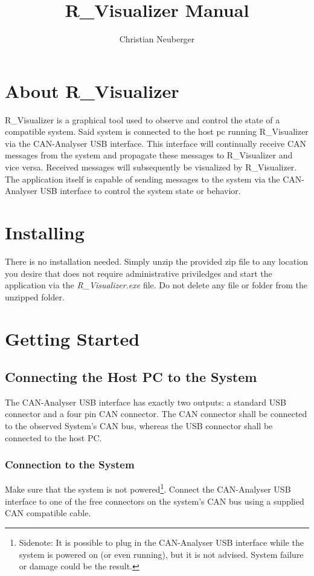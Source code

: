 \documentclass[12pt,a4paper]{scrartcl}
\author{Christian Neuberger}
\title{R\_Visualizer Manual}
\begin{document}
\maketitle
\newpage

\tableofcontents
\newpage

\section{About R\_Visualizer}
\label{sec:About}
R\_Visualizer is a graphical tool used to observe and control the state of a compatible system. Said system is connected to the host pc running R\_Visualizer via the CAN-Analyser USB interface. This interface will continually receive CAN messages from the system and propagate these messages to R\_Visualizer and vice versa. Received messages will subsequently be visualized by R\_Visualizer. The application itself is capable of sending messages to the system via the CAN-Analyser USB interface to control the system state or behavior.

\section{Installing}
\label{sec:Installing}
There is no installation needed. Simply unzip the provided zip file to any location you desire that does not require administrative priviledges and start the application via the \textit{R\_Visualizer.exe} file. Do not delete any file or folder from the unzipped folder.

\section{Getting Started}
\label{sec:GettingStarted}

\subsection{Connecting the Host PC to the System}
\label{subsec:GettingStartedEstablishConnection}
The CAN-Analyser USB interface has exactly two outputs: a standard USB connector and a four pin CAN connector. The CAN connector shall be connected to the observed System's CAN bus, whereas the USB connector shall be connected to the host PC.

\subsubsection{Connection to the System}
\label{subsubsec:GettingStartedEstablishConnectionConnectionToSystem}
Make sure that the system is not powered\footnote{Sidenote: It is possible to plug in the CAN-Analyser USB interface while the system is powered on (or even running), but it is not advised. System failure or damage could be the result.}. Connect the CAN-Analyser USB interface to one of the free connectors on the system's CAN bus using a supplied CAN compatible cable. 
\end{document}
